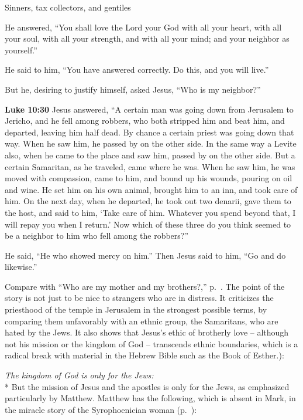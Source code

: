\documentclass[10pt,twoside]{article} %
\newcommand{\doimage}[2]{\texttt{[image: \#2]}\label{fig:#2}}
\newcommand{\figbasic}[4]{ %
    \ifthenelse{\isodd{\pageref{fig:#2}}}{}{\hfill}
    \ifstrempty{#3}{
      \doimage{#1}{#2}
    }{
      \makebox{\doimage{#1}{#2} \\ #3}
    }
    \ifthenelse{\isodd{\pageref{fig:#2}}}{\hfill}{}
    \par
}
\newcommand{\fig}[2][0.4]{
  \figbasic{#1}{#2}{}{}
}
\newcommand{\quotesize}{\normalsize{}}
\newcommand{\comm}[1]{\begingroup \color{black!50} #1\endgroup}
\newenvironment{quotetext}{\begingroup\quotesize}{\endgroup}
\newcommand{\intex}[1]{\index[texts]{#1}}
\newcommand{\bible}[2]{\begin{quotetext}\textbf{#1}\intex{#1} #2\end{quotetext}}
\newcommand{\luke}[2]{\bible{Luke #1}{#2}}
\newcommand{\subhead}[1]{\emph{#1}\\*}
\begin{document}
\begin{section}{Sinners, tax collectors, and gentiles}
{  He answered, ``You shall love the Lord your God with all your heart, with all your soul, with all your strength, and with all your mind; and your neighbor as yourself.''

  He said to him, ``You have answered correctly. Do this, and you will live.''

  But he, desiring to justify himself, asked Jesus, ``Who is my neighbor?''
}

\fig[1]{good-samaritan}


\luke{10:30}{
  Jesus answered, ``A certain man was going down from Jerusalem to Jericho, and he fell among robbers, who both stripped him and beat him, and departed, leaving him half dead.    By chance a certain priest was going down that way. When he saw him, he passed by on the other side.    In the same way a Levite also, when he came to the place and saw him, passed by on the other side.    But a certain Samaritan, as he traveled, came where he was. When he saw him, he was moved with compassion,    came to him, and bound up his wounds, pouring on oil and wine. He set him on his own animal, brought him to an inn, and took care of him.    On the next day, when he departed, he took out two denarii, gave them to the host, and said to him, `Take care of him. Whatever you spend beyond that, I will repay you when I return.'    Now which of these three do you think seemed to be a neighbor to him who fell among the robbers?''

  He said, ``He who showed mercy on him.''
Then Jesus said to him, ``Go and do likewise.'' 
}

\comm{Compare with ``Who are my mother and my brothers?,'' p.~\pageref{who-are-my-mother-and-my-brothers}.
The point of the story is not just to be nice to strangers who are in distress.
It criticizes the priesthood of the temple in Jerusalem in the strongest possible terms, by comparing them
unfavorably with an ethnic group, the Samaritans, who are hated by the Jews. It also shows that Jesus's ethic
of brotherly love -- although not his mission or the kingdom of God --
transcends ethnic boundaries, which is a radical break with material in the Hebrew Bible
such as the Book of Esther.):
}\label{gentile-evangelists-disagree}

\subhead{The kingdom of God is only for the Jews:}
\comm{
But the mission of Jesus and the apostles is only for the Jews, as emphasized particularly by Matthew.
Matthew has the following, which is absent in Mark, in the
miracle story of the Syrophoenician woman (p.~\pageref{canaanite-woman}):
}


\end{section}
\end{document}
